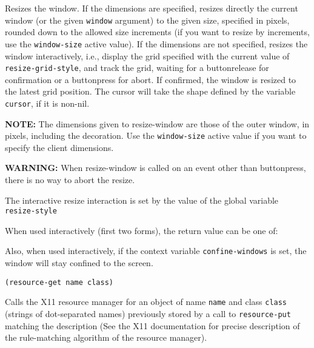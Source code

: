 Resizes the window. If the dimensions are specified, resizes directly the
current window (or the given \verb"window" argument) to the given size,
specified in pixels, rounded down to the allowed size increments (if you
want to resize by increments, use the \verb"window-size" active value). If
the dimensions are not specified, resizes the window interactively, i.e.,
display the grid specified with the current value of \verb"resize-grid-style",
and track the grid, waiting for a buttonrelease for confirmation or a
buttonpress for abort. If confirmed, the window is resized to the latest
grid position. The cursor will take the shape defined by the variable
\verb"cursor", if it is non-nil.

{\bf NOTE:} The dimensions given to resize-window are those of the outer
window, in pixels, including the {\GWM} decoration. Use the 
\verb"window-size" active value if you want to specify the client dimensions.

{\bf WARNING:} When resize-window is called on an event other than
buttonpress, there is no way to abort the resize.

The interactive resize interaction is set by the value of the global variable
\verb"resize-style"

When used interactively (first two forms), the return value can be one of:


Also, when used interactively, if the context variable \verb|confine-windows|
is set, the window will stay confined to the screen.

        
{\usagefont\begin{verbatim}
(resource-get name class)
\end{verbatim}}\usageupspace

Calls the X11 resource manager for an object of name \verb"name" and
class \verb"class" (strings of dot-separated names) previously stored
by a call to \verb"resource-put" matching the description (See the
X11 documentation for precise description of the rule-matching
algorithm of the resource manager).

